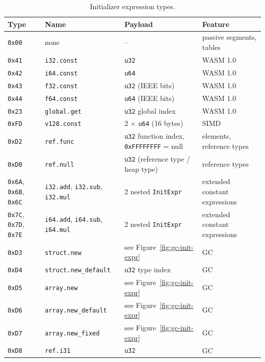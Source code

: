 \documentclass{article}
\begin{document}
\begin{table}[H]
\centering
\begin{tabular}{p{2.1cm}p{3.2cm}p{4.0cm}p{3.3cm}}
    \hline
    Type & Name & Payload & Feature \\
    \hline
    \verb|0x00| & none          & --                           & passive segments, tables \\
    \verb|0x41| & \verb|i32.const| & \verb|u32|                & WASM 1.0 \\
    \verb|0x42| & \verb|i64.const| & \verb|u64|                & WASM 1.0 \\
    \verb|0x43| & \verb|f32.const| & \verb|u32| (IEEE bits)    & WASM 1.0 \\
    \verb|0x44| & \verb|f64.const| & \verb|u64| (IEEE bits)    & WASM 1.0 \\
    \verb|0x23| & \verb|global.get| & \verb|u32| global index  & WASM 1.0 \\
    \verb|0xFD| & \verb|v128.const| & 2 $\times$ \verb|u64| (16 bytes) & SIMD \\
    \verb|0xD2| & \verb|ref.func| & \verb|u32| function index, \verb|0xFFFFFFFF| = null & elements, reference types \\
    \verb|0xD0| & \verb|ref.null| & \verb|u32| (reference type / heap type) & reference types \\
    \verb|0x6A|, \verb|0x6B|, \verb|0x6C| & \verb|i32.add|, \verb|i32.sub|, \verb|i32.mul| & 2 nested \verb|InitExpr| & extended constant expressions \\
    \verb|0x7C|, \verb|0x7D|, \verb|0x7E| & \verb|i64.add|, \verb|i64.sub|, \verb|i64.mul| & 2 nested \verb|InitExpr| & extended constant expressions \\
    \verb|0xD3| & \verb|struct.new| & see Figure~\ref{fig:gc-init-expr} & GC \\
    \verb|0xD4| & \verb|struct.new_default| & \verb|u32| type index & GC \\
    \verb|0xD5| & \verb|array.new| & see Figure~\ref{fig:gc-init-expr} & GC \\
    \verb|0xD6| & \verb|array.new_default| & see Figure~\ref{fig:gc-init-expr} & GC \\
    \verb|0xD7| & \verb|array.new_fixed| & see Figure~\ref{fig:gc-init-expr} & GC \\
    \verb|0xD8| & \verb|ref.i31| & \verb|u32| & GC \\
    \hline
\end{tabular}
\caption{Initializer expression types.}
\label{table:init-expr-type}
\end{table}
\end{document}

